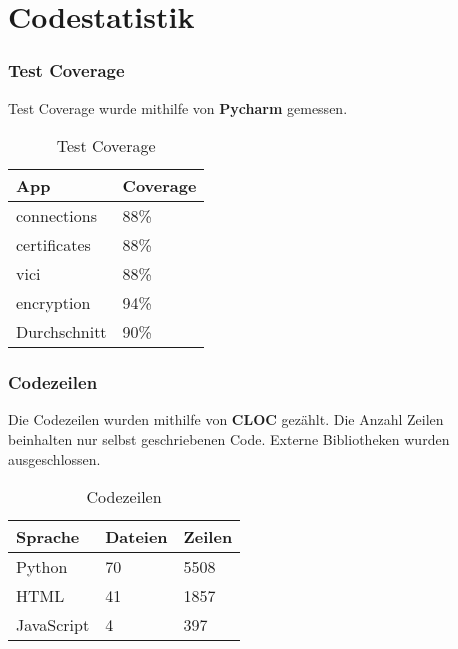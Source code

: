 \section{Codestatistik}
\subsubsection{Test Coverage}
Test Coverage wurde mithilfe von \textbf{Pycharm} gemessen. \\

\begin{table}[H]
\centering
    \begin{tabular}{|p{6cm}|p{6cm}|}
    \hline    
    \rowcolor{lightblue}
	App & Coverage \\ \hline
	connections & 88\% \\ \hline    
	certificates & 88\% \\ \hline   
	vici & 88\% \\ \hline  
	encryption & 94\% \\ \hline  
	\rowcolor{lightblue}
	Durchschnitt &   90\% \\ \hline
    \end{tabular}
    \caption[Test Coverage]{Test Coverage}
\end{table}

\subsubsection{Codezeilen}
Die Codezeilen wurden mithilfe von \textbf{CLOC} \cite{CLOC} gezählt. Die Anzahl Zeilen beinhalten nur selbst geschriebenen Code. Externe Bibliotheken wurden ausgeschlossen. \\

\begin{table}[H]
\centering
    \begin{tabular}{|p{3cm} |p{3cm} |p{3cm} |}
    \hline    
    \rowcolor{lightblue}
	Sprache & Dateien & Zeilen  \\ \hline   
	Python & 70 & 5508 \\ \hline
	HTML & 41 & 1857 \\ \hline
	JavaScript & 4 & 397 \\ \hline
    \end{tabular}
    \caption[Codezeilen]{Codezeilen}
\end{table}

